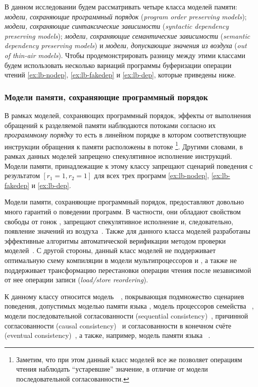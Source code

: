 В данном исследовании будем рассматривать четыре класса моделей памяти: 
\emph{модели, сохраняющие программный порядок}
(\emph{program order preserving models}); 
\emph{модели, сохраняющие синтаксические зависимости} 
(\emph{syntactic dependency preserving models});
\emph{модели, сохраняющие семантические зависимости} 
(\emph{semantic dependency preserving models}) и 
\emph{модели, допускающие значения из воздуха} 
(\emph{out of thin-air models}).
Чтобы продемонстрировать разницу между этими классами 
будем использовать несколько вариаций программы 
буферизации операции чтений 
\ref{ex:lb-nodep}, \ref{ex:lb-fakedep} и \ref{ex:lb-dep}, 
которые приведены ниже. 



\subsubsection*{Модели памяти, сохраняющие программный порядок}

В рамках моделей, сохраняющих программный порядок, 
эффекты от выполнения обращений к разделяемой памяти
наблюдаются потоками согласно их \emph{программному порядку}
то есть в линейном порядке в котором соответствующие 
инструкции обращения к памяти расположены в потоке%
\footnote{Заметим, что при этом данный класс моделей 
все же позволяет операциям чтения наблюдать ``устаревшие'' значение, 
в отличие от модели последовательной согласованности.}. 
Другими словами, в рамках данных моделей запрещено 
спекулятивное исполнение инструкций. 
Модели памяти, принадлежащие к этому классу 
запрещают сценарий поведения с результатом ${[r_1=1,r_2=1]}$
для всех трех программ \ref{ex:lb-nodep}, \ref{ex:lb-fakedep} и \ref{ex:lb-dep}.

Модели памяти, сохраняющие программный порядок, 
предоставляют довольно много гарантий о поведении программ. 
В частности, они обладают свойством свободы от гонок \DRF, 
запрещают спекулятивное исполнение и, следовательно, 
появление значений из воздуха~\cite{Lahav-al:PLDI17}. 
Также для данного класса моделей разработаны эффективные 
алгоритмы автоматической верификации 
методом проверки моделей~\cite{Kokologiannakis-al:POPL2017, Kokologiannakis:PLDI2019}.
С другой стороны, данный класс моделей не поддерживает
оптимальную схему компиляции в модели мультипроцессоров
\ARM и \POWER, а также не поддерживает трансформацию 
перестановки операции чтения после независимой
от нее операции записи (\emph{load/store reordering}). 

К данному классу относится модель~\RCMM~\cite{Lahav-al:PLDI17}, 
покрывающая подмножество сценариев поведения, допустимых моделью памяти языка \CLANG,
модель \TSO процессоров семейства \Intel~\cite{Sewell-al:CACM10},
модели последовательной согласованности (sequential consistency)~\cite{Lamport:TC79},
причинной согласованности (causal consistency)~\autocite{Lahav-Boker:PLDI2020}
и согласованности в конечном счёте (eventual consistency)~\cite{Jagadeesan-al:ESOP2018},
а также, например, модель памяти языка \OCaml~\cite{Dolan-al:PLDI18}.

